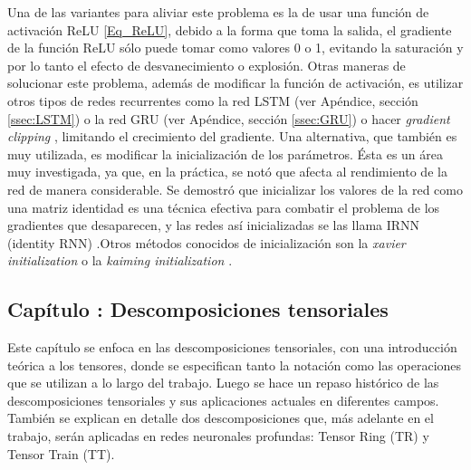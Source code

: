 \documentclass[spanish]{article}
\theoremstyle{definition}
\theoremstyle{remark}
\numberwithin{equation}{section}
\numberwithin{equation}{section} %
\begin{document}
Una de las variantes para aliviar este problema es la de usar una función de activación ReLU \eqref{Eq_ReLU}\cite{xu2015empirical,glorot2011deep}, debido a la forma que toma la salida, el gradiente de la función ReLU sólo puede tomar como valores 0 o 1, evitando la saturación y por lo tanto el efecto de desvanecimiento o explosión. Otras maneras de solucionar este problema, además de modificar la función de activación, es utilizar otros tipos de redes recurrentes como la red LSTM \cite{hochreiter1997long} (ver Apéndice, sección \ref{ssec:LSTM}) o la red GRU \cite{cho2014learning} (ver Apéndice, sección \ref{ssec:GRU}) o hacer \textit{gradient clipping} \cite{pascanu2013difficulty}, limitando el crecimiento del gradiente. Una alternativa, que también es muy utilizada, es modificar la inicialización de los parámetros. Ésta es un área muy investigada, ya que, en la práctica, se notó que afecta al rendimiento de la red de manera considerable. Se demostró que inicializar los valores de la red como una matriz identidad es una técnica efectiva para combatir el problema de los gradientes que desaparecen, y las redes así inicializadas se las llama IRNN (identity RNN) \cite{le2015simple}.Otros métodos conocidos de inicialización son la \textit{xavier initialization} \cite{glorot2010understanding} o la \textit{kaiming initialization} \cite{he2015delving}.
\par
 \clearpage
\vspace*{0.25in}
\begin{center}
\begin{LARGE}
 \section{Capítulo \thesection: Descomposiciones tensoriales}
\end{LARGE}
\end{center}
\vspace*{0.25in}
\normalsize Este capítulo se enfoca en las descomposiciones tensoriales, con una introducción teórica a los tensores, donde se especifican tanto la notación como las operaciones que se utilizan a lo largo del trabajo. Luego se hace un repaso histórico de las descomposiciones tensoriales y sus aplicaciones actuales en diferentes campos. También se explican en detalle dos descomposiciones que, más adelante en el trabajo, serán aplicadas en redes neuronales profundas: Tensor Ring (TR) y Tensor Train (TT). 
\par
\end{document}
